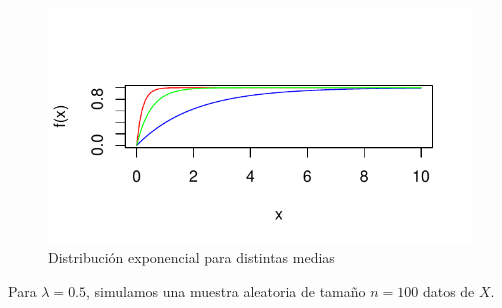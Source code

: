 \documentclass[10pt]{article}\usepackage[]{graphicx}\usepackage[]{xcolor}
\makeatletter
\def\maxwidth{ %
  \ifdim\Gin@nat@width>\linewidth
    \linewidth
  \else
    \Gin@nat@width
  \fi
}
\newenvironment{knitrout}{}{} %
\makeatother
\begin{document}
\begin{knitrout}
\color{fgcolor}\begin{figure}[ht]

{\centering \includegraphics[width=\maxwidth]{figure/distribuciones-1} 

}

\caption[Distribución exponencial para distintas medias]{Distribución exponencial para distintas medias}\label{fig:distribuciones}
\end{figure}

\end{knitrout}


Para $\lambda=0.5$, simulamos una muestra aleatoria de tamaño $n=100$ datos de $X$.
\end{document}
